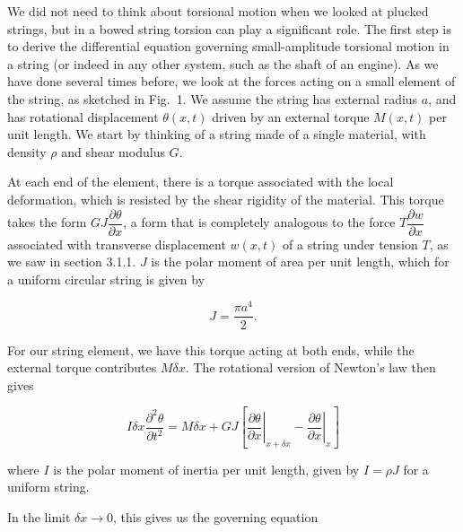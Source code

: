   We did not need to think about torsional motion when we looked at plucked 
  strings, but in a bowed string torsion can play a significant role. The first 
  step is to derive the differential equation governing small-amplitude 
  torsional motion in a string (or indeed in any other system, such as the 
  shaft of an engine). As we have done several times before, we look at the 
  forces acting on a small element of the string, as sketched in Fig.\ 1. We 
  assume the string has external radius $a$, and has rotational displacement 
  $\theta(x,t)$ driven by an external torque $M(x,t)$ per unit length. We start 
  by thinking of a string made of a single material, with density $\rho$ and 
  shear modulus $G$. 


  At each end of the element, there is a torque associated with the local 
  deformation, which is resisted by the shear rigidity of the material. This 
  torque takes the form $GJ \dfrac{\partial \theta}{\partial x}$, a form that 
  is completely analogous to the force $T \dfrac{\partial w}{\partial x}$ 
  associated with transverse displacement $w(x,t)$ of a string under tension 
  $T$, as we saw in section 3.1.1. $J$ is the polar moment of area per unit 
  length, which for a uniform circular string is given by 

  \begin{equation*}J=\dfrac{\pi a^4}{2} . \tag{1}\end{equation*} 

  For our string element, we have this torque acting at both ends, while the 
  external torque contributes $M \delta x$. The rotational version of Newton's 
  law then gives 

  \begin{equation*}I \delta x \dfrac{\partial^2 \theta}{\partial t^2} = M 
  \delta x +GJ\left[ \left.\dfrac{\partial \theta}{\partial x} \right|_{x+ 
  \delta x} -\left.\dfrac{\partial \theta}{\partial x} \right|_{x} \right] 
  \tag{2}\end{equation*} 

  \noindent{}where $I$ is the polar moment of inertia per unit length, given by 
  $I=\rho J$ for a uniform string. 

  In the limit $\delta x \rightarrow 0$, this gives us the governing equation 

